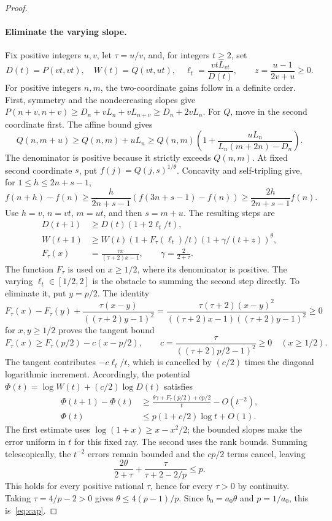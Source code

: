 \documentclass[11pt]{article}
\theoremstyle{remark}
\begin{document}
\begin{proof}
\paragraph{Eliminate the varying slope.}
Fix positive integers $u,v$, let $\tau=u/v$, and, for integers $t\geq2$,
set
\[
 D(t)=P(vt,vt),\quad W(t)=Q(vt,ut),\quad
 \ell_t=\frac{vtL_{vt}}{D(t)},\qquad z=\frac{u-1}{2v+u}\geq0.
\]
For positive integers $n,m$, the two-coordinate gains follow in a
definite order. First, symmetry
and the nondecreasing slopes give
$P(n+v,n+v)\geq D_n+vL_n+vL_{n+v}\geq D_n+2vL_n$.
For $Q$, move in the second coordinate first. The affine bound gives
\[
 Q(n,m+u)\geq Q(n,m)+uL_n
 \geq Q(n,m)\left(1+
          \frac{uL_n}{L_n(m+2n)-D_n}\right).
\]
The denominator is positive because it strictly exceeds $Q(n,m)$.
At fixed second coordinate $s$, put $f(j)=Q(j,s)^{1/\theta}$.
Concavity and self-tripling give, for $1\leq h\leq2n+s-1$,
\[
 f(n+h)-f(n)\geq\frac{h}{2n+s-1}(f(3n+s-1)-f(n))
             \geq\frac{2h}{2n+s-1}f(n).
\]
Use $h=v$, $n=vt$, $m=ut$, and then $s=m+u$. The resulting steps are
\begin{align*}
 D(t+1)&\geq D(t)(1+2\ell_t/t),\\
 W(t+1)&\geq W(t)(1+F_\tau(\ell_t)/t)
                       (1+\gamma/(t+z))^\theta,\\
 F_\tau(x)&=\frac{\tau x}{(\tau+2)x-1},\qquad
 \gamma=\frac2{2+\tau}.
\end{align*}
The function $F_\tau$ is used on $x\geq1/2$, where its denominator is positive.
The varying $\ell_t\in[1/2,2]$ is the obstacle to summing the
second step directly. To eliminate it, put $y=p/2$. The identity
\[
 F_\tau(x)-F_\tau(y)+
 \frac{\tau(x-y)}{((\tau+2)y-1)^2}
 =\frac{\tau(\tau+2)(x-y)^2}
 {((\tau+2)x-1)((\tau+2)y-1)^2}\geq0
\]
for $x,y\geq1/2$ proves the tangent bound
\[
 F_\tau(x)\geq F_\tau(p/2)-c(x-p/2),\qquad
 c=\frac{\tau}{((\tau+2)p/2-1)^2}\geq0\quad(x\geq1/2).
\]
The tangent contributes $-c\ell_t/t$, which is cancelled by
$(c/2)$ times the diagonal logarithmic increment. Accordingly, the
potential $\Phi(t)=\log W(t)+(c/2)\log D(t)$ satisfies
\begin{align*}
 \Phi(t+1)-\Phi(t)&\geq
 \frac{\theta\gamma+F_\tau(p/2)+cp/2}{t}-O(t^{-2}),\\
 \Phi(t)&\leq p(1+c/2)\log t+O(1).
\end{align*}
The first estimate uses $\log(1+x)\geq x-x^2/2$; the bounded slopes
make the error uniform in $t$ for this fixed ray. The second uses the
rank bounds. Summing telescopically, the $t^{-2}$ errors remain bounded
and the $cp/2$ terms cancel, leaving
\[
 \frac{2\theta}{2+\tau}+\frac{\tau}{\tau+2-2/p}\leq p.
\]
This holds for every positive rational $\tau$, hence for every
$\tau>0$ by continuity. Taking $\tau=4/p-2>0$ gives
$\theta\leq4(p-1)/p$. Since $b_0=a_0\theta$ and $p=1/a_0$,
this is~\eqref{eq:cap}.
\end{proof}
\end{document}
